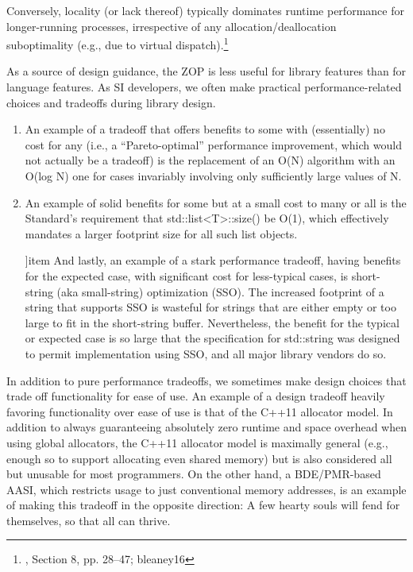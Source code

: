 \begin{enumerate}
Conversely, locality (or lack thereof) typically dominates runtime performance
for longer-running processes, irrespective of any allocation/deallocation
suboptimality (e.g., due to virtual dispatch).\footnote{\cite{lakos16}, Section 8, pp. 28–47; bleaney16}
\end{enumerate}

As a source of design guidance, the ZOP is less useful for library features than for
language features. As SI developers, we often make practical performance-related
choices and tradeoffs during library design.

\begin{enumerate}
\item An example of a tradeoff that offers benefits to some with (essentially) no cost
for any (i.e., a “Pareto-optimal” performance improvement, which would not
actually be a tradeoff) is the replacement of an O(N) algorithm with an O(log N)
one for cases invariably involving only sufficiently large values of N.

\item An example of solid benefits for some but at a small cost to many or all is the
Standard’s requirement that std::list<T>::size() be O(1), which
effectively mandates a larger footprint size for all such list objects.

]item And lastly, an example of a stark performance tradeoff, having benefits for the
expected case, with significant cost for less-typical cases, is short-string (aka
small-string) optimization (SSO). The increased footprint of a string that
supports SSO is wasteful for strings that are either empty or too large to fit in
the short-string buffer. Nevertheless, the benefit for the typical or expected
case is so large that the specification for std::string was designed to permit
implementation using SSO, and all major library vendors do so.
\end{enumerate}

In addition to pure performance tradeoffs, we sometimes make design choices that
trade off functionality for ease of use. An example of a design tradeoff heavily
favoring functionality over ease of use is that of the C++11 allocator model. In
addition to always guaranteeing absolutely zero runtime and space overhead when
using global allocators, the C++11 allocator model is maximally general (e.g., enough
so to support allocating even shared memory) but is also considered all but
unusable for most programmers. On the other hand, a BDE/PMR-based AASI,
which restricts usage to just conventional memory addresses, is an example of
making this tradeoff in the opposite direction: A few hearty souls will fend for
themselves, so that all can thrive.

